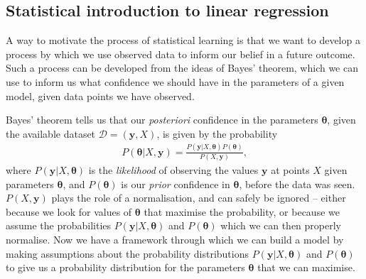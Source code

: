 \documentclass[twocolumn,english,notitlepage]{article}
\renewcommand{\vec}[1]{\boldsymbol{#1}}
\begin{document}
        


    \subsection{Statistical introduction to linear regression}
        A way to motivate the process of statistical learning is that we want to develop a process by which we use observed data to inform our belief in a future outcome. Such a process can be developed from the ideas of Bayes' theorem, which we can use to inform us what confidence we should have in the parameters of a given model, given data points we have observed.
        
        Bayes' theorem tells us that our \textit{posteriori} confidence in the parameters $\vec{\theta}$, given the available dataset $\mathcal{D}=(\vec{y}, X)$, is given by the probability
        \begin{align}
            P(\vec{\theta}|X, \vec{y}) = \frac{P(\vec{y}|X,\vec{\vec{\theta}})P(\vec{\theta})}{P(X,\vec{y})},
        \end{align}
        where $P(\vec{y}|X, \vec{\theta})$ is the \textit{likelihood} of observing the values $\vec{y}$ at points $X$ given parameters $\vec{\theta}$, and $P(\vec{\theta})$ is our \textit{prior} confidence in $\vec{\theta}$, before the data was seen. $P(X,\vec{y})$ plays the role of a normalisation, and can safely be ignored -- either because we look for values of $\vec{\theta}$ that maximise the probability, or because we assume the probabilities $P(\vec{y}|X,\vec{\theta})$ and $P(\vec{\theta})$ which we can then properly normalise. Now we have a framework through which we can build a model by making assumptions about the probability distributions $P(\vec{y}|X,\vec{\theta})$ and $P(\vec{\theta})$ to give us a probability distribution for the parameters $\vec{\theta}$ that we can maximise.
\end{document}
